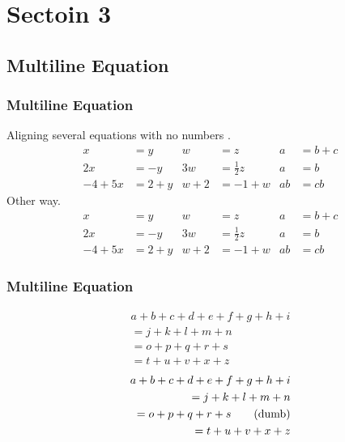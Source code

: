 \section{Sectoin 3}
\subsection{Multiline Equation}
\begin{frame}
    \frametitle{Multiline Equation}
    Aligning several equations with no numbers  \cite{oetiker1995not}
    .
    \begin{align*}
        x&=y           &  w &=z              &  a&=b+c\\
        2x&=-y         &  3w&=\frac{1}{2}z   &  a&=b\\
        -4 + 5x&=2+y   &  w+2&=-1+w          &  ab&=cb
    \end{align*}
    Other way.
    \begin{equation}
    \begin{aligned}
        x&=y           &  w &=z              &  a&=b+c\\
        2x&=-y         &  3w&=\frac{1}{2}z   &  a&=b\\
        -4 + 5x&=2+y   &  w+2&=-1+w          &  ab&=cb
    \end{aligned}
\end{equation}
\end{frame}
\begin{frame}
    \frametitle{Multiline Equation}
    \begin{multline}
        a + b + c + d + e + f+ g + h + i \\
        = j + k + l + m + n\\
        = o + p + q + r + s\\
        = t + u + v + x + z
    \end{multline}
    \begin{align}
        a + b + c + d + e + f+ g + h + i \\
        = j + k + l + m + n \notag\\
        = o + p + q + r + s \tag{dumb}\\
        = t + u + v + x + z
    \end{align}
\end{frame}

